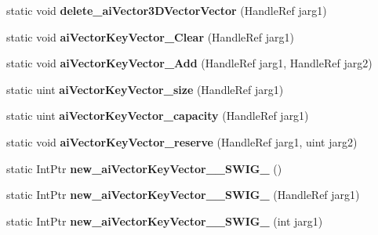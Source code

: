 \begin{DoxyCompactItemize}
\item 
\hypertarget{class_assimp_p_i_n_v_o_k_e_a4dd483385806ed616c2f9473dc93f2c0}{static void {\bfseries delete\+\_\+ai\+Vector3\+D\+Vector\+Vector} (Handle\+Ref jarg1)}\label{class_assimp_p_i_n_v_o_k_e_a4dd483385806ed616c2f9473dc93f2c0}

\item 
\hypertarget{class_assimp_p_i_n_v_o_k_e_a5931c43d37e55c91d3a7200860a3af92}{static void {\bfseries ai\+Vector\+Key\+Vector\+\_\+\+Clear} (Handle\+Ref jarg1)}\label{class_assimp_p_i_n_v_o_k_e_a5931c43d37e55c91d3a7200860a3af92}

\item 
\hypertarget{class_assimp_p_i_n_v_o_k_e_a14d2dd0f3cc88820acedb4ee9b0a83a7}{static void {\bfseries ai\+Vector\+Key\+Vector\+\_\+\+Add} (Handle\+Ref jarg1, Handle\+Ref jarg2)}\label{class_assimp_p_i_n_v_o_k_e_a14d2dd0f3cc88820acedb4ee9b0a83a7}

\item 
\hypertarget{class_assimp_p_i_n_v_o_k_e_adddedae65cca746b96a0bf463d4c2f39}{static uint {\bfseries ai\+Vector\+Key\+Vector\+\_\+size} (Handle\+Ref jarg1)}\label{class_assimp_p_i_n_v_o_k_e_adddedae65cca746b96a0bf463d4c2f39}

\item 
\hypertarget{class_assimp_p_i_n_v_o_k_e_af7f29ca8215cf18b8474a864288d2748}{static uint {\bfseries ai\+Vector\+Key\+Vector\+\_\+capacity} (Handle\+Ref jarg1)}\label{class_assimp_p_i_n_v_o_k_e_af7f29ca8215cf18b8474a864288d2748}

\item 
\hypertarget{class_assimp_p_i_n_v_o_k_e_adfac3c05cdd0ce7dbc7bfb7bf94be898}{static void {\bfseries ai\+Vector\+Key\+Vector\+\_\+reserve} (Handle\+Ref jarg1, uint jarg2)}\label{class_assimp_p_i_n_v_o_k_e_adfac3c05cdd0ce7dbc7bfb7bf94be898}

\item 
\hypertarget{class_assimp_p_i_n_v_o_k_e_a8f4cc11771c60d673aca0f9cfd721489}{static Int\+Ptr {\bfseries new\+\_\+ai\+Vector\+Key\+Vector\+\_\+\+\_\+\+S\+W\+I\+G\+\_} ()}\label{class_assimp_p_i_n_v_o_k_e_a8f4cc11771c60d673aca0f9cfd721489}

\item 
\hypertarget{class_assimp_p_i_n_v_o_k_e_afcba2cb606b9c6ba382f6ac1e720b338}{static Int\+Ptr {\bfseries new\+\_\+ai\+Vector\+Key\+Vector\+\_\+\+\_\+\+S\+W\+I\+G\+\_} (Handle\+Ref jarg1)}\label{class_assimp_p_i_n_v_o_k_e_afcba2cb606b9c6ba382f6ac1e720b338}

\item 
\hypertarget{class_assimp_p_i_n_v_o_k_e_a81bdbca1960bc6b94c2e22ccb96a457d}{static Int\+Ptr {\bfseries new\+\_\+ai\+Vector\+Key\+Vector\+\_\+\+\_\+\+S\+W\+I\+G\+\_} (int jarg1)}\label{class_assimp_p_i_n_v_o_k_e_a81bdbca1960bc6b94c2e22ccb96a457d}


\end{DoxyCompactItemize}
